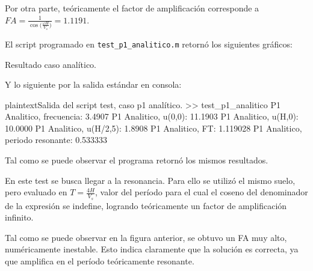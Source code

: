 Por otra parte, teóricamente el factor de amplificación corresponde a $FA=\frac{1}{\cos\bigg(\frac{\omega H}{V_s}\bigg)} = 1.1191$.

El script programado en \texttt{test\_p1\_analitico.m} retornó los siguientes gráficos:

\begin{images}{Resultado caso analítico.}
\end{images}

Y lo siguiente por la salida estándar en consola:

\begin{sourcecode}{plaintext}{Salida del script test, caso p1 analítico.}
>> test_p1_analitico
P1 Analitico, frecuencia: 3.4907
P1 Analitico, u(0,0): 11.1903
P1 Analitico, u(H,0): 10.0000
P1 Analitico, u(H/2,5): 1.8908
P1 Analitico, FT: 1.119028
P1 Analitico, periodo resonante: 0.533333
\end{sourcecode}

Tal como se puede observar el programa retornó los mismos resultados.

\newpage
{}

En este test se busca llegar a la resonancia. Para ello se utilizó el mismo suelo, pero evaluado en $T=\frac{4H}{V_s}$, valor del período para el cual el coseno del denominador de la expresión se indefine, logrando teóricamente un factor de amplificación infinito.


Tal como se puede observar en la figura anterior, se obtuvo un FA muy alto, numéricamente inestable. Esto indica claramente que la solución es correcta, ya que amplifica en el período teóricamente resonante.